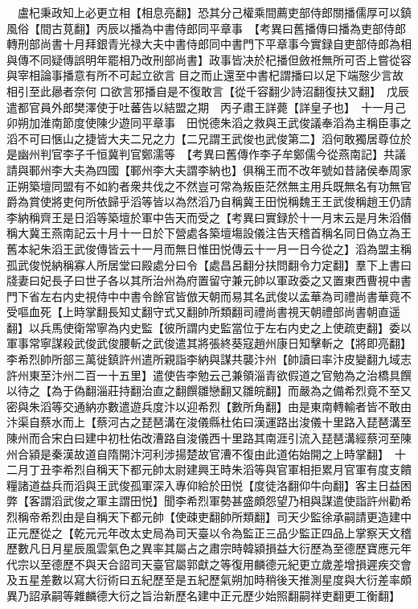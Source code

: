 　盧杞秉政知上必更立相【相息亮翻】恐其分己權乘間薦吏部侍郎關播儒厚可以鎮風俗【間古莧翻】丙辰以播為中書侍郎同平章事　【考異曰舊播傳曰播為吏部侍郎轉刑部尚書十月拜銀青光禄大夫中書侍郎同中書門下平章事今實録自吏部侍郎為相與傳不同疑傳誤明年罷相乃改刑部尚書】政事皆决於杞播但斂袵無所可否上嘗從容與宰相論事播意有所不可起立欲言目之而止還至中書杞謂播曰以足下端慤少言故相引至此曏者奈何口欲言邪播自是不復敢言【從千容翻少詩沼翻復扶又翻】　戊辰遣都官員外郎樊澤使于吐蕃告以結盟之期　丙子肅王詳薨【詳皇子也】　十一月己卯朔加淮南節度使陳少遊同平章事　田悦德朱滔之救與王武俊議奉滔為主稱臣事之滔不可曰愜山之捷皆大夫二兄之力【二兄謂王武俊也武俊第二】滔何敢獨居尊位於是幽州判官李子千恒冀判官鄭濡等　【考異曰舊傳作李子牟鄭儒今從燕南記】共議請與鄆州李大夫為四國【鄆州李大夫謂李納也】俱稱王而不改年號如昔諸侯奉周家正朔築壇同盟有不如約者衆共伐之不然豈可常為叛臣茫然無主用兵既無名有功無官爵為賞使將吏何所依歸乎滔等皆以為然滔乃自稱冀王田悦稱魏王王武俊稱趙王仍請李納稱齊王是日滔等築壇於軍中告天而受之【考異曰實録於十一月末云是月朱滔僭稱大冀王燕南記云十月十一日於下營處各築壇塲設儀注告天稽首稱名同日偽立為王舊本紀朱滔王武俊傳皆云十一月而無日惟田悦傳云十一月一日今從之】滔為盟主稱孤武俊悦納稱寡人所居堂曰殿處分曰令【處昌呂翻分扶問翻令力定翻】羣下上書曰牋妻曰妃長子曰世子各以其所治州為府置留守兼元帥以軍政委之又置東西曹視中書門下省左右内史視侍中中書令餘官皆倣天朝而易其名武俊以孟華為司禮尚書華竟不受嘔血死【上時掌翻長知丈翻守式又翻帥所類翻司禮尚書視天朝禮部尚書朝直遥翻】以兵馬使衛常寧為内史監【彼所謂内史監當位于左右内史之上使疏吏翻】委以軍事常寧謀殺武俊武俊腰斬之武俊遣其將張終葵寇趙州康日知擊斬之【將即亮翻】李希烈帥所部三萬徙鎮許州遣所親詣李納與謀共襲汴州【帥讀曰率汴皮變翻九域志許州東至汴州二百一十五里】遣使告李勉云己兼領淄青欲假道之官勉為之治橋具饌以待之【為于偽翻淄莊持翻治直之翻饌雛戀翻又雛皖翻】而嚴為之備希烈竟不至又密與朱滔等交通納亦數遣遊兵度汴以迎希烈【數所角翻】由是東南轉輸者皆不敢由汴渠自蔡水而上【蔡河古之琵琶溝在浚儀縣杜佑曰漢運路出浚儀十里路入琵琶溝至陳州而合宋白曰建中初杜佑改漕路自浚儀西十里路其南涯引流入琵琶溝經蔡河至陳州合潁是秦漢故道自隋開汴河利涉揚楚故官漕不復由此道佑始開之上時掌翻】　十二月丁丑李希烈自稱天下都元帥太尉建興王時朱滔等與官軍相拒累月官軍有度支饋糧諸道益兵而滔與王武俊孤軍深入專仰給於田悦【度徒洛翻仰牛向翻】客主日益困弊【客謂滔武俊之軍主謂田悦】聞李希烈軍勢甚盛頗怨望乃相與謀遣使詣許州勸希烈稱帝希烈由是自稱天下都元帥【使疎吏翻帥所類翻】司天少監徐承嗣請更造建中正元歷從之【乾元元年改太史局為司天臺以令為監正三品少監正四品上掌察天文稽歷數凡日月星辰風雲氣色之異率其屬占之肅宗時韓潁損益大衍歷為至德歷寶應元年代宗以至德歷不與天合詔司天臺官屬郭獻之等復用麟德元紀更立歲差增損遲疾交會及五星差數以寫大衍術曰五紀歷至是五紀歷氣朔加時稍後天推測星度與大衍差率頗異乃詔承嗣等雜麟德大衍之旨治新歷名建中正元歷少始照翻嗣祥吏翻更工衡翻】

